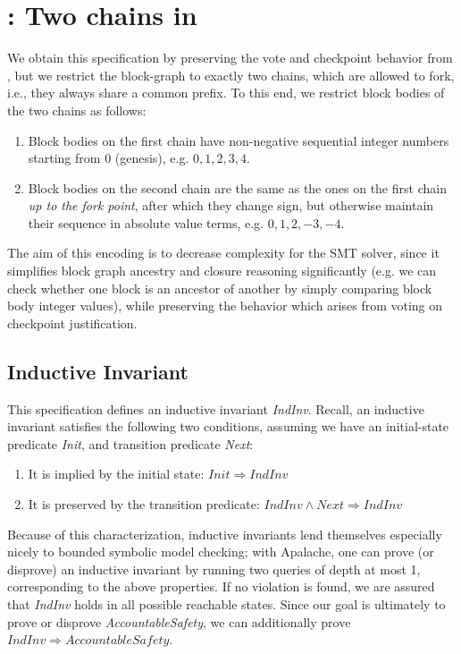 
\section{\SpecFour{}: Two chains in \tlap{}}\label{sec:spec4}

We obtain this specification by preserving the vote and checkpoint behavior from \SpecThree{}, but we restrict the block-graph to exactly two chains, which are allowed to fork, i.e., they always share a common prefix.
To this end, we restrict block bodies of the two chains as follows:
\begin{enumerate}
	\item Block bodies on the first chain have non-negative sequential integer numbers starting from 0 (genesis), e.g. $0, 1, 2,3, 4$.
	\item Block bodies on the second chain are the same as the ones on the first chain \emph{up to the fork point}, after which they change sign, but otherwise maintain their sequence in absolute value terms, e.g. $0, 1,2,-3,-4$.
\end{enumerate}

The aim of this encoding is to decrease complexity for the SMT solver, since it simplifies block graph ancestry and closure reasoning significantly (e.g. we can check whether one block is an ancestor of another by simply comparing block body integer values), while preserving the behavior which arises from voting on checkpoint justification.

\subsection{Inductive Invariant}\label{sec:spec4-indinv}

This specification defines an inductive invariant \textit{IndInv}. Recall, an inductive invariant satisfies the following two conditions, assuming we have an initial-state predicate \textit{Init}, and transition predicate \textit{Next}:
\begin{enumerate}
	\item It is implied by the initial state: $\mathit{Init} \Rightarrow \mathit{IndInv}$
	\item It is preserved by the transition predicate: $\mathit{IndInv} \land \mathit{Next} \Rightarrow \mathit{IndInv}$
\end{enumerate}
Because of this characterization, inductive invariants lend themselves especially nicely to bounded symbolic model checking; with Apalache, one can prove (or disprove) an inductive invariant by running two queries of depth at most 1, corresponding to the above properties.
If no violation is found, we are assured that \textit{IndInv} holds in all possible reachable states.
Since our goal is ultimately to prove or disprove \textit{AccountableSafety}, we can additionally prove $\mathit{IndInv} \Rightarrow \mathit{AccountableSafety}$.

